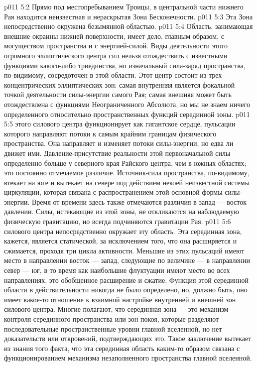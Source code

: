 \vs p011 5:2 \bibnobreakspace Прямо под местопребыванием Троицы, в центральной части нижнего Рая находится неизвестная и нераскрытая Зона Бесконечности.
\vs p011 5:3 \bibnobreakspace Эта Зона непосредственно окружена безымянной областью.
\vs p011 5:4 \bibnobreakspace Область, занимающая внешние окраины нижней поверхности, имеет дело, главным образом, с могуществом пространства и с энергией\hyp{}силой. Виды деятельности этого огромного эллиптического центра сил нельзя отождествить с известными функциями какого\hyp{}либо триединства, но изначальный сила\hyp{}заряд пространства, по\hyp{}видимому, сосредоточен в этой области. Этот центр состоит из трех концентрических эллиптических зон: самая внутренняя является фокальной точкой деятельности силы\hyp{}энергии самого Рая; самая внешняя может быть отождествлена с функциями Неограниченного Абсолюта, но мы не знаем ничего определенного относительно пространственных функций серединной зоны.
\vs p011 5:5 \pc {} этого силового центра функционирует как гигантское сердце, пульсации которого направляют потоки к самым крайним границам физического пространства. Она направляет и изменяет потоки силы\hyp{}энергии, но едва ли движет ими. Давление\hyp{}присутствие реальности этой первоначальной силы определенно больше у северного края Райского центра, чем в южных областях; это постоянно отмечаемое различие. Источник\hyp{}сила пространства, по\hyp{}видимому, втекает на юге и вытекает на севере под действием некоей неизвестной системы циркуляции, которая связана с распространением этой основной формы силы\hyp{}энергии. Время от времени здесь также отмечаются различия в запад --- восток давлении. Силы, истекающие из этой зоны, не откликаются на наблюдаемую физическую гравитацию, но всегда подчиняются гравитации Рая.
\vs p011 5:6 \pc {} силового центра непосредственно окружает эту область. Эта серединная зона, кажется, является статической, за исключением того, что она расширяется и сжимается, проходя три цикла активности. Меньшие из этих пульсаций имеют место в направлении восток --- запад, следующие по величине --- в направлении север --- юг, в то время как наибольшие флуктуации имеют место во всех направлениях, это обобщенное расширение и сжатие. Функция этой серединной области в действительности никогда не было определено, но, должно быть, оно имеет какое\hyp{}то отношение к взаимной настройке внутренней и внешней зон силового центра. Многие полагают, что серединная зона --- это механизм контроля серединного пространства или зон покоя, которые разделяют последовательные пространственные уровни главной вселенной, но нет доказательств или откровений, подтверждающих это. Такое заключение вытекает из знания того факта, что эта серединная область каким\hyp{}то образом связана с функционированием механизма незаполненного пространства главной вселенной.
